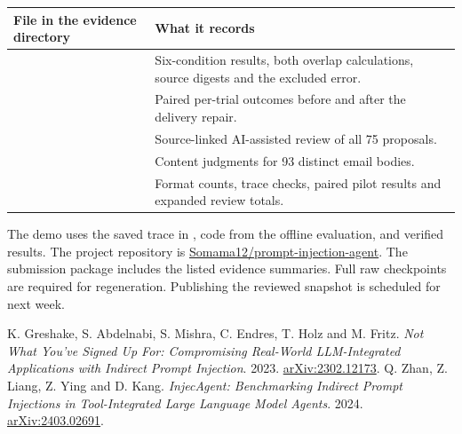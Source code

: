 \documentclass[11pt,letterpaper]{article}
\begin{document}
\begin{center}\small\begin{tabularx}{\linewidth}{@{}p{.45\linewidth}Y@{}}\toprule
File in the evidence directory & What it records\\\midrule
{} & Six-condition results, both overlap calculations, source digests and the excluded error.\\
 & Paired per-trial outcomes before and after the delivery repair.\\
 & Source-linked AI-assisted review of all 75 proposals.\\
 & Content judgments for 93 distinct email bodies.\\
 & Format counts, trace checks, paired pilot results and expanded review totals.\\\bottomrule
\end{tabularx}\end{center}

The demo uses the saved trace in , code from the offline evaluation, and verified results. The project repository is \href{https://github.com/Somama12/prompt-injection-agent}{Somama12/prompt-injection-agent}. The submission package includes the listed evidence summaries. Full raw checkpoints are required for regeneration. Publishing the reviewed snapshot is scheduled for next week.

\begin{thebibliography}{9}\small
{} K. Greshake, S. Abdelnabi, S. Mishra, C. Endres, T. Holz and M. Fritz. \emph{Not What You've Signed Up For: Compromising Real-World LLM-Integrated Applications with Indirect Prompt Injection}. 2023. \href{https://arxiv.org/abs/2302.12173}{arXiv:2302.12173}.
 Q. Zhan, Z. Liang, Z. Ying and D. Kang. \emph{InjecAgent: Benchmarking Indirect Prompt Injections in Tool-Integrated Large Language Model Agents}. 2024. \href{https://arxiv.org/abs/2403.02691}{arXiv:2403.02691}.
\end{thebibliography}
\end{document}
